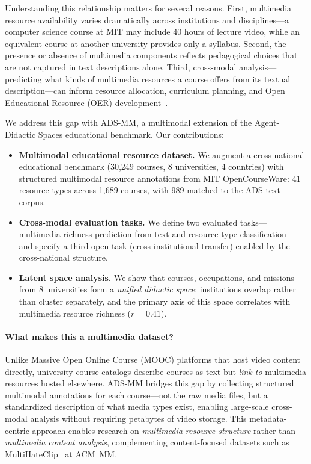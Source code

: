 \documentclass[sigconf,review]{acmart}
\newcommand{\NumUniversities}{8}
\newcommand{\NumCountries}{4}
\newcommand{\NumCourses}{30,249}
\newcommand{\NumOCWFetched}{1,689}        %
\newcommand{\NumOCWMatched}{989}          %
\newcommand{\NumResourceTypes}{41}        %
\newcommand{\ADSMM}{\textsc{ADS-MM}\xspace}
\begin{document}
Understanding this relationship matters for several reasons.
First, multimedia resource availability varies dramatically across institutions and disciplines---a computer science course at MIT may include 40 hours of lecture video, while an equivalent course at another university provides only a syllabus.
Second, the presence or absence of multimedia components reflects pedagogical choices that are not captured in text descriptions alone.
Third, cross-modal analysis---predicting what kinds of multimedia resources a course offers from its textual description---can inform resource allocation, curriculum planning, and Open Educational Resource (OER) development~\cite{aucancela2023ersslr}.

We address this gap with \ADSMM, a multimodal extension of the Agent-Didactic Spaces educational benchmark.
Our contributions:

\begin{itemize}
  \item \textbf{Multimodal educational resource dataset.}
  We augment a cross-national educational benchmark ({\NumCourses} courses, {\NumUniversities} universities, {\NumCountries} countries) with structured multimodal resource annotations from MIT OpenCourseWare: {\NumResourceTypes} resource types across {\NumOCWFetched} courses, with {\NumOCWMatched} matched to the ADS text corpus.

  \item \textbf{Cross-modal evaluation tasks.}
  We define two evaluated tasks---multimedia richness prediction from text and resource type classification---and specify a third open task (cross-institutional transfer) enabled by the cross-national structure.

  \item \textbf{Latent space analysis.}
  We show that courses, occupations, and missions from {\NumUniversities} universities form a \emph{unified didactic space}: institutions overlap rather than cluster separately, and the primary axis of this space correlates with multimedia resource richness ($r{=}0.41$).
\end{itemize}

\paragraph{What makes this a multimedia dataset?}
Unlike Massive Open Online Course (MOOC) platforms that host video content directly, university course catalogs describe courses as text but \emph{link to} multimedia resources hosted elsewhere.
\ADSMM bridges this gap by collecting structured multimodal annotations for each course---not the raw media files, but a standardized description of what media types exist, enabling large-scale cross-modal analysis without requiring petabytes of video storage.
This metadata-centric approach enables research on \emph{multimedia resource structure} rather than \emph{multimedia content analysis}, complementing content-focused datasets such as MultiHateClip~\cite{multihateclip2024} at ACM~MM.
\end{document}
